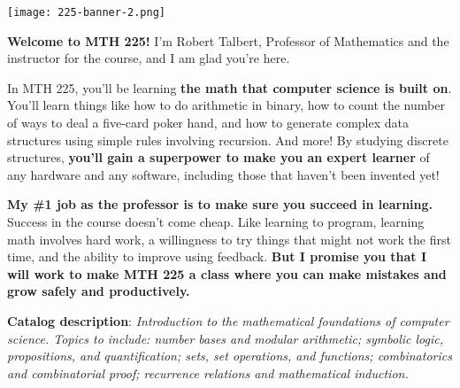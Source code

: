 \documentclass[]{article}
\date{}
\begin{document}
\begin{flushleft}
  \texttt{[image: 225-banner-2.png]}
\end{flushleft}


\textbf{Welcome to MTH 225!} I'm Robert Talbert, Professor of Mathematics and the instructor for the course, and I am glad you're here. 

In MTH 225, you'll be learning \textbf{the math that computer science is built on}. You'll learn things like how to do arithmetic in binary, how to count the number of ways to deal a five-card poker hand, and how to generate complex data structures using simple rules involving recursion. And more! By studying discrete structures, \textbf{you'll gain a superpower to make you an expert learner} of any hardware and any software, including those that haven't been invented yet! 

\textbf{My \#1 job as the professor is to make sure you succeed in learning.} Success in the course doesn't come cheap. Like learning to program, learning math involves hard work, a willingness to try things that might not work the first time, and the ability to improve using feedback. \textbf{But I promise you that I will work to make MTH 225 a class where you can make mistakes and grow safely and productively.} 

\textbf{Catalog description}: \textit{Introduction to the mathematical foundations of computer science. Topics to include: number bases and modular arithmetic; symbolic logic, propositions, and quantification; sets, set operations, and functions; combinatorics and combinatorial proof; recurrence relations and mathematical induction.} 
\end{document}
